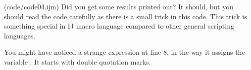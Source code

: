 (code/code04.ijm)
Did you get some results printed out? It should, but you should read the code carefully as there is a small trick in this code.  This trick is something special in IJ macro language compared to other general scripting languages.

You might have noticed a strange expression at line 8, in the way it assigns the variable . 
It starts with double quotation marks. \\